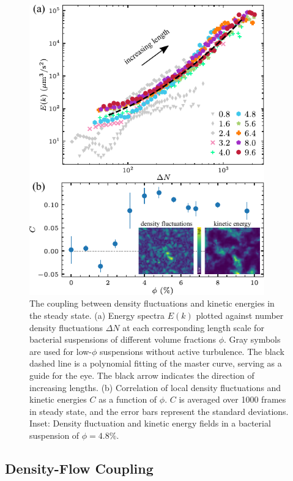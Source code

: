 \begin{figure}[!ht]
\begin{center}
\includegraphics[width=4in]{figs/5-GNF/6.pdf}
\caption[The Coupling between GNF and Kinetic Energy Spectra]
{
The coupling between density fluctuations and kinetic energies in the steady state.
(a) Energy spectra $E(k)$ plotted against number density fluctuations $\Delta N$ at each corresponding length scale for bacterial suspensions of different volume fractions $\phi$. Gray symbols are used for low-$\phi$ suspensions without active turbulence. The black dashed line is a polynomial fitting of the master curve, serving as a guide for the eye. The black arrow indicates the direction of increasing lengths.
(b) Correlation of local density fluctuations and kinetic energies $C$ as a function of $\phi$. $C$ is averaged over 1000 frames in steady state, and the error bars represent the standard deviations. Inset: Density fluctuation and kinetic energy fields in a bacterial suspension of $\phi = 4.8\%$.
}
\label{fig:GNF-energy-spectra-correlation}
\end{center}
\end{figure}


\subsection{Density-Flow Coupling}

